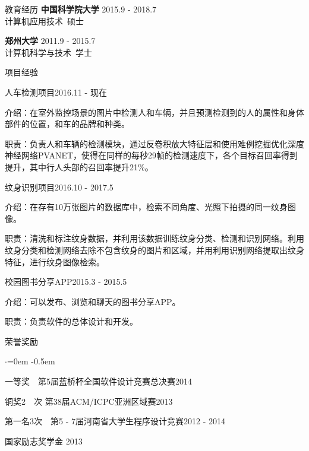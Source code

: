 \documentclass{resume} %
\begin{document}
\begin{rSection}{教育经历}
{\bf 中国科学院大学} \hfill {2015.9 - 2018.7} \\
计算机应用技术\ 硕士

{\bf 郑州大学} \hfill {2011.9 - 2015.7} \\
计算机科学与技术\ 学士
\end{rSection}


\begin{rSection}{项目经验}
\begin{rSubsection}{人车检测项目}{2016.11 - 现在}{}{}
\item 介绍：在室外监控场景的图片中检测人和车辆，并且预测检测到的人的属性和身体部件的位置，和车的品牌和种类。
\item 职责：负责人和车辆的检测模块，通过反卷积放大特征层和使用难例挖掘优化深度神经网络PVANET，使得在同样的每秒29帧的检测速度下，各个目标召回率得到提升，其中行人头部的召回率提升21\%。
\end{rSubsection}

\begin{rSubsection}{纹身识别项目}{2016.10 - 2017.5}{}{}
\item 介绍：在存有10万张图片的数据库中，检索不同角度、光照下拍摄的同一纹身图像。
\item 职责：清洗和标注纹身数据，并利用该数据训练纹身分类、检测和识别网络。利用纹身分类和检测网络去除不包含纹身的图片和区域，并用利用识别网络提取出纹身特征，进行纹身图像检索。
\end{rSubsection}


\begin{rSubsection}{校园图书分享APP}{2015.3 - 2015.5}{}{}
\item 介绍：可以发布、浏览和聊天的图书分享APP。
\item 职责：负责软件的总体设计和开发。
\end{rSubsection}
\end{rSection}


\begin{rSection}{荣誉奖励}
\begin{list}{$\cdot$}{\leftmargin=0em}
\itemsep -0.5em \vspace{0em}
\item 一等奖~~第5届蓝桥杯全国软件设计竞赛总决赛\hfill{2014}
\item 铜奖2~~次 第38届ACM/ICPC亚洲区域赛\hfill {2013}
\item 第一名3次~~第5 - 7届河南省大学生程序设计竞赛\hfill {2012 - 2014}
\item 国家励志奖学金 \hfill {2013}
\end{list}
\end{rSection}
\end{document}

